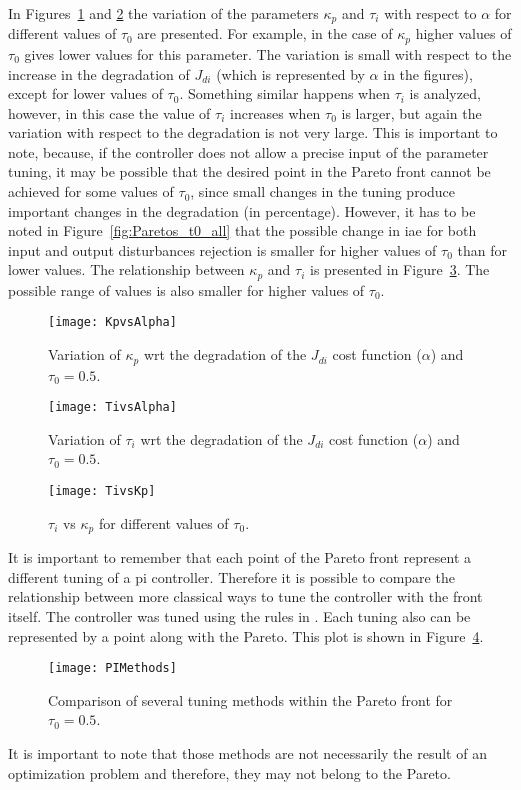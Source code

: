 In Figures~\ref{fig:KpvsAlpha} and \ref{fig:TivsAlpha} the variation of the parameters $\kappa_p$ and $\tau_i$ with respect to $\alpha$ for different values of $\tau_0$ are presented. For example, in the case of $\kappa_p$ higher values of $\tau_0$ gives lower values for this parameter. The variation is small with respect to the increase in the degradation of $J_{di}$ (which is represented by $\alpha$ in the figures), except for lower values of $\tau_0$. Something similar happens when $\tau_i$ is analyzed, however, in this case the value of $\tau_i$ increases when $\tau_0$ is larger, but again the variation with respect to the degradation is not very large. This is important to note, because, if the controller does not allow a precise input of the parameter tuning, it may be possible that the desired point in the Pareto front cannot be achieved for some values of $\tau_0$, since small changes in the tuning produce important changes in the degradation (in percentage). However, it has to be noted in Figure~\ref{fig:Paretos_t0_all} that the possible change in \gls{iae} for both input and output disturbances rejection is smaller for higher values of $\tau_0$ than for lower values. The relationship between $\kappa_p$ and $\tau_i$ is presented in Figure~\ref{fig:TivsKp}. The possible range of values is also smaller for higher values of $\tau_0$. 
%
\begin{figure}%
\centering
\texttt{[image: KpvsAlpha]}%
\caption{Variation of $\kappa_p$ wrt the degradation of the $J_{di}$ cost function ($\alpha$) and $\tau_0=0.5$.}%
\label{fig:KpvsAlpha}%
\end{figure}
%
\begin{figure}%
\centering
\texttt{[image: TivsAlpha]}%
\caption{Variation of $\tau_i$ wrt the degradation of the $J_{di}$ cost function ($\alpha$) and $\tau_0=0.5$.}%
\label{fig:TivsAlpha}%
\end{figure}
%
\begin{figure}%
\centering
\texttt{[image: TivsKp]}%
\caption{$\tau_i$ vs $\kappa_p$ for different values of $\tau_0$.}%
\label{fig:TivsKp}%
\end{figure}
%

It is important to remember that each point of the Pareto front represent a different tuning of a \gls{pi} controller. Therefore it is possible to compare the relationship between more classical ways to tune the controller with the front itself. The controller was tuned using the rules in \citet{ODwyer2000,Astrom1995,Murril1967,Rovira1969,Grimholt2012, Smith1985, Ziegler1942}. Each tuning also can be represented by a point along with the Pareto. This plot is shown in Figure~\ref{fig:PIMethods}. %
%
\begin{figure}%
	\centering
	\texttt{[image: PIMethods]}%
	\caption{Comparison of several tuning methods within the Pareto front for $\tau_0=0.5$.}%
	\label{fig:PIMethods}%
\end{figure}
%
It is important to note that those methods are not necessarily the result of an optimization problem and therefore, they may not belong to the Pareto.

